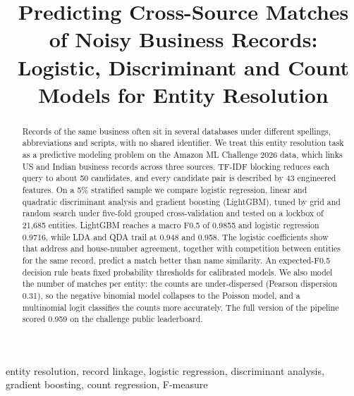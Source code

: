 \documentclass[conference]{IEEEtran}
\begin{document}
\title{Predicting Cross-Source Matches of Noisy Business Records: Logistic, Discriminant and Count Models for Entity Resolution}

\author{
\and
{}
}

\maketitle

\begin{abstract}
Records of the same business often sit in several databases under different spellings, abbreviations and scripts,
with no shared identifier. We treat this entity resolution task as a predictive modeling problem on the Amazon ML
Challenge 2026 data, which links US and Indian business records across three sources. TF-IDF blocking reduces each
query to about 50 candidates, and every candidate pair is described by 43 engineered features. On a 5\% stratified
sample we compare logistic regression, linear and quadratic discriminant analysis and gradient boosting (LightGBM),
tuned by grid and random search under five-fold grouped cross-validation and tested on a lockbox of 21,685 entities.
LightGBM reaches a macro F0.5 of 0.9855 and logistic regression 0.9716, while LDA and QDA trail at 0.948 and 0.958.
The logistic coefficients show that address and house-number agreement, together with competition between entities
for the same record, predict a match better than name similarity. An expected-F0.5 decision rule beats fixed
probability thresholds for calibrated models. We also model the number of matches per entity: the counts are
under-dispersed (Pearson dispersion 0.31), so the negative binomial model collapses to the Poisson model, and a
multinomial logit classifies the counts more accurately. The full version of the pipeline scored 0.959 on the challenge
public leaderboard.
\end{abstract}

\begin{IEEEkeywords}
entity resolution, record linkage, logistic regression, discriminant analysis, gradient boosting, count regression, F-measure
\end{IEEEkeywords}






\end{document}
